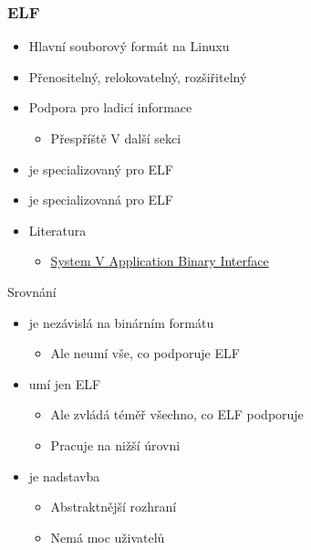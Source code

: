 
\begin{frame}[fragile]
  \frametitle{ELF}

  \begin{itemize}
    \item Hlavní souborový formát na Linuxu
    \item Přenositelný, relokovatelný, rozšiřitelný

    \pause

    \item Podpora pro ladicí informace
    \begin{itemize}
      \item \iffimuni Přespříště \else V další sekci \fi
    \end{itemize}

    \pause

    \item {} je specializovaný  pro ELF
    \item {} je specializovaná  pro ELF

    \pause

    \item Literatura
    \begin{itemize}
      \item \href{http://www.sco.com/developers/devspecs/gabi41.pdf}{System V Application Binary Interface}
    \end{itemize}
  \end{itemize}

\end{frame}

\begin{frame}{}{Srovnání}

  \begin{itemize}
    \item {} je nezávislá na binárním formátu
    \begin{itemize}
      \item Ale neumí vše, co podporuje ELF
    \end{itemize}

    \pause

    \item {} umí jen ELF
    \begin{itemize}
      \item Ale zvládá téměř všechno, co ELF podporuje
      \item Pracuje na nižší úrovni
    \end{itemize}

    \pause

    \item {} je nadstavba 
    \begin{itemize}
      \item Abstraktnější rozhraní
      \item Nemá moc uživatelů
    \end{itemize}
  \end{itemize}

\end{frame}

